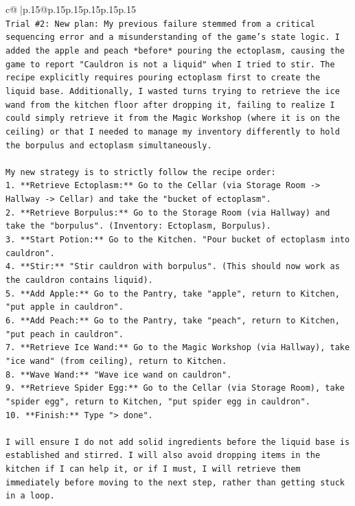 \documentclass{article}
\begin{document}
{\begin{supertabular}{c@{$\;$}|p{.15\linewidth}@{}p{.15\linewidth}p{.15\linewidth}p{.15\linewidth}p{.15\linewidth}p{.15\linewidth}}
{{{\\ 
\texttt{Trial \#2: New plan: My previous failure stemmed from a critical sequencing error and a misunderstanding of the game's state logic. I added the apple and peach *before* pouring the ectoplasm, causing the game to report "Cauldron is not a liquid" when I tried to stir. The recipe explicitly requires pouring ectoplasm first to create the liquid base. Additionally, I wasted turns trying to retrieve the ice wand from the kitchen floor after dropping it, failing to realize I could simply retrieve it from the Magic Workshop (where it is on the ceiling) or that I needed to manage my inventory differently to hold the borpulus and ectoplasm simultaneously.} \\
\\ 
\texttt{My new strategy is to strictly follow the recipe order:} \\
\texttt{1.  **Retrieve Ectoplasm:** Go to the Cellar (via Storage Room {-}> Hallway {-}> Cellar) and take the "bucket of ectoplasm".} \\
\texttt{2.  **Retrieve Borpulus:** Go to the Storage Room (via Hallway) and take the "borpulus". (Inventory: Ectoplasm, Borpulus).} \\
\texttt{3.  **Start Potion:** Go to the Kitchen. "Pour bucket of ectoplasm into cauldron".} \\
\texttt{4.  **Stir:** "Stir cauldron with borpulus". (This should now work as the cauldron contains liquid).} \\
\texttt{5.  **Add Apple:** Go to the Pantry, take "apple", return to Kitchen, "put apple in cauldron".} \\
\texttt{6.  **Add Peach:** Go to the Pantry, take "peach", return to Kitchen, "put peach in cauldron".} \\
\texttt{7.  **Retrieve Ice Wand:** Go to the Magic Workshop (via Hallway), take "ice wand" (from ceiling), return to Kitchen.} \\
\texttt{8.  **Wave Wand:** "Wave ice wand on cauldron".} \\
\texttt{9.  **Retrieve Spider Egg:** Go to the Cellar (via Storage Room), take "spider egg", return to Kitchen, "put spider egg in cauldron".} \\
\texttt{10. **Finish:** Type "> done".} \\
\\ 
\texttt{I will ensure I do not add solid ingredients before the liquid base is established and stirred. I will also avoid dropping items in the kitchen if I can help it, or if I must, I will retrieve them immediately before moving to the next step, rather than getting stuck in a loop.} \\
}}}
\end{supertabular}}
\end{document}
